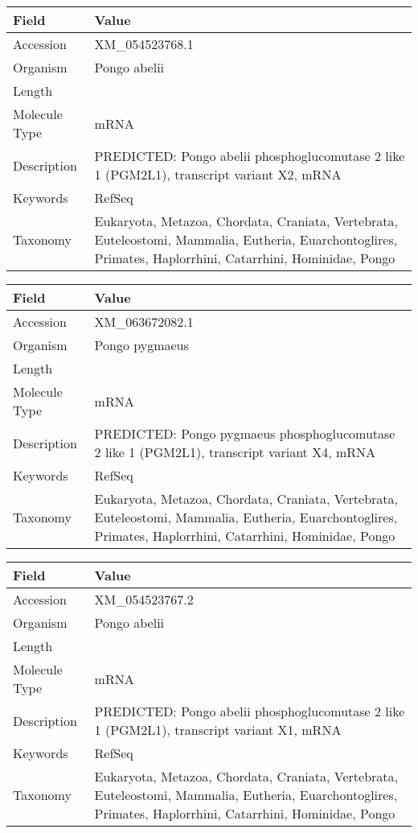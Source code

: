 \documentclass[10pt]{article}
\begin{document}
\vspace{1em}
{\footnotesize
\begin{longtable}{>{\raggedright\arraybackslash}p{4.5cm} >{\raggedright\arraybackslash}p{11.5cm}}
\textbf{Field} & \textbf{Value} \\
\hline
Accession & XM\_054523768.1 \\
Organism & Pongo abelii \\
Length & 7379 \\
Molecule Type & mRNA \\
Description & PREDICTED: Pongo abelii phosphoglucomutase 2 like 1 (PGM2L1), transcript variant X2, mRNA \\
Keywords & RefSeq \\
Taxonomy & Eukaryota, Metazoa, Chordata, Craniata, Vertebrata, Euteleostomi, Mammalia, Eutheria, Euarchontoglires, Primates, Haplorrhini, Catarrhini, Hominidae, Pongo \\
\end{longtable}
}

\vspace{1em}
{\footnotesize
\begin{longtable}{>{\raggedright\arraybackslash}p{4.5cm} >{\raggedright\arraybackslash}p{11.5cm}}
\textbf{Field} & \textbf{Value} \\
\hline
Accession & XM\_063672082.1 \\
Organism & Pongo pygmaeus \\
Length & 8324 \\
Molecule Type & mRNA \\
Description & PREDICTED: Pongo pygmaeus phosphoglucomutase 2 like 1 (PGM2L1), transcript variant X4, mRNA \\
Keywords & RefSeq \\
Taxonomy & Eukaryota, Metazoa, Chordata, Craniata, Vertebrata, Euteleostomi, Mammalia, Eutheria, Euarchontoglires, Primates, Haplorrhini, Catarrhini, Hominidae, Pongo \\
\end{longtable}
}

\vspace{1em}
{\footnotesize
\begin{longtable}{>{\raggedright\arraybackslash}p{4.5cm} >{\raggedright\arraybackslash}p{11.5cm}}
\textbf{Field} & \textbf{Value} \\
\hline
Accession & XM\_054523767.2 \\
Organism & Pongo abelii \\
Length & 7559 \\
Molecule Type & mRNA \\
Description & PREDICTED: Pongo abelii phosphoglucomutase 2 like 1 (PGM2L1), transcript variant X1, mRNA \\
Keywords & RefSeq \\
Taxonomy & Eukaryota, Metazoa, Chordata, Craniata, Vertebrata, Euteleostomi, Mammalia, Eutheria, Euarchontoglires, Primates, Haplorrhini, Catarrhini, Hominidae, Pongo \\
\end{longtable}
}
\end{document}
